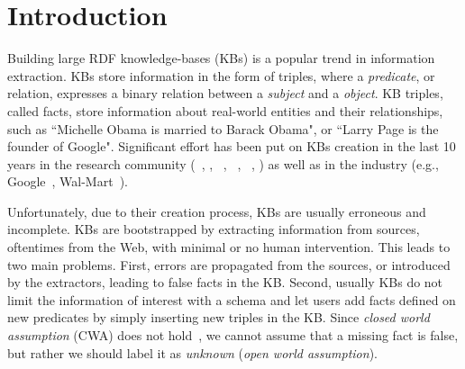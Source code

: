 \section{Introduction}

Building large RDF knowledge-bases (KBs) is a popular trend in information extraction.
KBs store information in the form of triples, where a \emph{predicate}, or relation, expresses a binary relation between a \emph{subject} and a \emph{object}. KB triples, called facts, store information about real-world entities and their relationships, such as %
``Michelle Obama is married to Barack Obama", or ``Larry Page is the founder of Google".
Significant effort has been put on KBs creation in the last 10 years in the research community (~\cite{bizer2009dbpedia}, \cite{bollacker2008freebase}, ~\cite{vrandevcic2014wikidata}, \deepdive~\cite{shin2015incremental}, ~\cite{suchanek2007yago}, 
\cite{banko2007open}) as well as in the industry %
(e.g., 
Google~\cite{dong2014data}, Wal-Mart~\cite{deshpande2013building}).

Unfortunately, due to their creation process, KBs are usually erroneous and incomplete.
KBs are bootstrapped by extracting information from sources, oftentimes from the Web, with minimal or no human intervention.  This leads to two main problems. First, errors are propagated from the sources, or introduced by the extractors, leading to false facts in the KB. Second, usually KBs do not limit the information of interest with a schema
and let users add facts defined on new predicates by simply inserting new triples in the KB. %
Since \emph{closed world assumption} (CWA) does not hold~\cite{dong2014data,galarraga2015fast}, we cannot assume that a missing fact is false, but rather we should label it as \emph{unknown} (\emph{open world assumption}).


